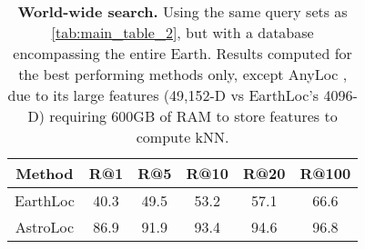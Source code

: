 
\begin{table}
\begin{center}
\begin{adjustbox}{width=0.95\columnwidth}
\begin{tabular}{c|ccccc}
\toprule
Method & R@1 & R@5 & R@10 & R@20 & R@100 \\
\midrule
EarthLoc  & 40.3 & 49.5 & 53.2 & 57.1 & 66.6 \\
AstroLoc  & 86.9 & 91.9 & 93.4 & 94.6 & 96.8 \\
\bottomrule
\end{tabular}
\end{adjustbox}
\end{center}
\vspace{-5mm}
\caption{\textbf{World-wide search.} Using the same query sets as \cref{tab:main_table_2}, but with a database encompassing the entire Earth. Results computed for the best performing methods only, except AnyLoc \cite{Keetha_2023_AnyLoc}, due to its large features (49,152-D vs EarthLoc's 4096-D) requiring \>600GB of RAM to store features to compute kNN.}
\vspace{-5mm}
\label{tab:worldwide}
\end{table}

